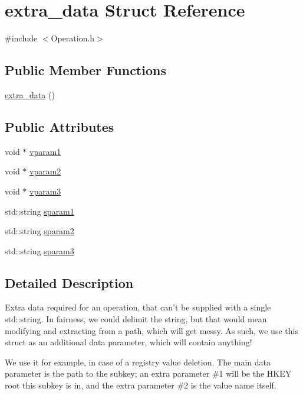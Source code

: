 \section{extra\-\_\-data Struct Reference}
\label{structextra__data}


{\ttfamily \#include $<$Operation.\-h$>$}

\subsection*{Public Member Functions}
\begin{DoxyCompactItemize}
\item 
\hyperlink{structextra__data_a7268a468de6d93f22dcf442369ffd677}{extra\-\_\-data} ()
\end{DoxyCompactItemize}
\subsection*{Public Attributes}
\begin{DoxyCompactItemize}
\item 
void $\ast$ \hyperlink{structextra__data_aa88b067ee0b747f759ad58640844bcef}{vparam1}
\item 
void $\ast$ \hyperlink{structextra__data_adb05046c11bd9c7764e44228bedf70ff}{vparam2}
\item 
void $\ast$ \hyperlink{structextra__data_ac1707ed14198c9d3a4427ac604adb22e}{vparam3}
\item 
std\-::string \hyperlink{structextra__data_a820375f50557b0cb69d0428bbd5cc814}{sparam1}
\item 
std\-::string \hyperlink{structextra__data_afbf03110827f675cc011556a8f739d2e}{sparam2}
\item 
std\-::string \hyperlink{structextra__data_a5474fb70e903b28215022700f0c252e1}{sparam3}
\end{DoxyCompactItemize}


\subsection{Detailed Description}
Extra data required for an operation, that can't be supplied with a single std\-::string. In fairness, we could delimit the string, but that would mean modifying and extracting from a path, which will get messy. As such, we use this struct as an additional data parameter, which will contain anything!

We use it for example, in case of a registry value deletion. The main data parameter is the path to the subkey; an extra parameter \#1 will be the H\-K\-E\-Y root this subkey is in, and the extra parameter \#2 is the value name itself.

